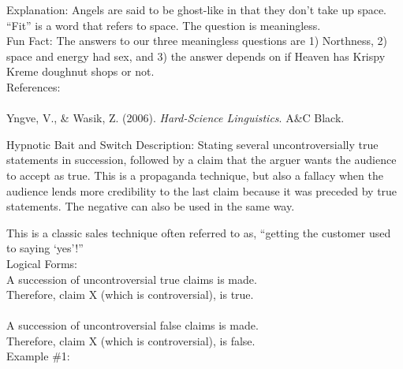 \documentclass[a4paper,12pt,single,pdftex]{scrbook}
\begin{document}
    
      Explanation: Angels are said to be ghost-like in that they don’t take up space. “Fit” is a word that refers to space. The question is meaningless.
    \\

    
      Fun Fact: The answers to our three meaningless questions are 1) Northness, 2) space and energy had sex, and 3) the answer depends on if Heaven has Krispy Kreme doughnut shops or not.
    \\

    
      References:
    \\

    
      
        
      \\

      
        
          Yngve, V., \& Wasik, Z. (2006). {\it Hard-Science Linguistics}. A\&C Black.
        
      
    
  

Hypnotic Bait and Switch
    Description: Stating several uncontroversially true statements in succession, followed by a claim that the arguer wants the audience to accept as true.  This is a propaganda technique, but also a fallacy when the audience lends more credibility to the last claim because it was preceded by true statements.  The negative can also be used in the same way.

    
      This is a classic sales technique often referred to as, “getting the customer used to saying ‘yes’!”
    \\

    
      Logical Forms:
    \\

    
      A succession of uncontroversial true claims is made.
    \\

    
      Therefore, claim X (which is controversial), is true.
    \\

    
       
    \\

    
      A succession of uncontroversial false claims is made.
    \\

    
      Therefore, claim X (which is controversial), is false.
    \\

    
      Example \#1:
    \\
\end{document}
